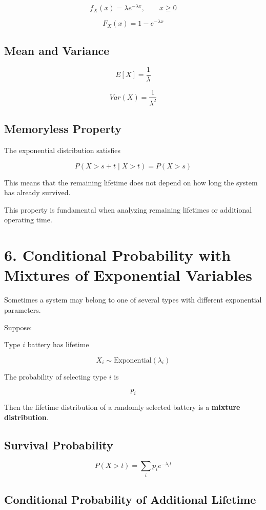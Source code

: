 \documentclass[12pt]{article}
\begin{document}
\[
f_X(x)=\lambda e^{-\lambda x}, \qquad x\ge0
\]

\[
F_X(x)=1-e^{-\lambda x}
\]

\subsection*{Mean and Variance}

\[
E[X]=\frac{1}{\lambda}
\]

\[
Var(X)=\frac{1}{\lambda^2}
\]

\subsection*{Memoryless Property}

The exponential distribution satisfies

\[
P(X>s+t \mid X>t)=P(X>s)
\]

This means that the remaining lifetime does not depend on how long the system has already survived.

This property is fundamental when analyzing remaining lifetimes or additional operating time.

\section*{6. Conditional Probability with Mixtures of Exponential Variables}

Sometimes a system may belong to one of several types with different exponential parameters.

Suppose:

Type $i$ battery has lifetime

\[
X_i \sim \text{Exponential}(\lambda_i)
\]

The probability of selecting type $i$ is

\[
p_i
\]

Then the lifetime distribution of a randomly selected battery is a \textbf{mixture distribution}.

\subsection*{Survival Probability}

\[
P(X>t)=\sum_i p_i e^{-\lambda_i t}
\]

\subsection*{Conditional Probability of Additional Lifetime}
\end{document}
